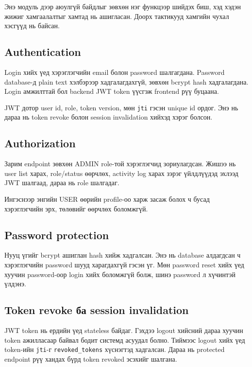 \documentclass[12pt,a4paper]{article}
\begin{document}
Энэ модуль дээр аюулгүй байдлыг зөвхөн нэг функцээр шийдэх биш, хэд хэдэн жижиг хамгаалалтыг хамтад нь ашигласан. Доорх тактикууд хамгийн чухал хэсгүүд нь байсан.

\subsection{Authentication}

Login хийх үед хэрэглэгчийн email болон password шалгагдана. Password database-д plain text хэлбэрээр хадгалагдахгүй, зөвхөн bcrypt hash хадгалагдана. Login амжилттай бол backend JWT token үүсгэж frontend рүү буцаана.

JWT дотор user id, role, token version, мөн \texttt{jti} гэсэн unique id ордог. Энэ нь дараа нь token revoke болон session invalidation хийхэд хэрэг болсон.

\subsection{Authorization}

Зарим endpoint зөвхөн ADMIN role-той хэрэглэгчид зориулагдсан. Жишээ нь user list харах, role/status өөрчлөх, activity log харах зэрэг үйлдлүүдэд эхлээд JWT шалгаад, дараа нь role шалгадаг.

Ингэснээр энгийн USER өөрийн profile-оо харж засаж болох ч бусад хэрэглэгчийн эрх, төлөвийг өөрчлөх боломжгүй.

\subsection{Password protection}

Нууц үгийг bcrypt ашиглан hash хийж хадгалсан. Энэ нь database алдагдсан ч хэрэглэгчийн password шууд харагдахгүй гэсэн үг. Мөн password reset хийх үед хуучин password-оор login хийх боломжгүй болж, шинэ password л хүчинтэй үлдэнэ.

\subsection{Token revoke ба session invalidation}

JWT token нь ердийн үед stateless байдаг. Гэхдээ logout хийсний дараа хуучин token ажилласаар байвал бодит системд асуудал болно. Тиймээс logout хийх үед token-ийн \texttt{jti}-г \texttt{revoked\_tokens} хүснэгтэд хадгалсан. Дараа нь protected endpoint рүү хандах бүрд token revoked эсэхийг шалгана.
\end{document}
